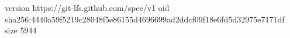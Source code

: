 version https://git-lfs.github.com/spec/v1
oid sha256:4440a59f5219c28048f5e86155d4696699ad2ddcf09f18e6fd5d32975e7171df
size 5944
